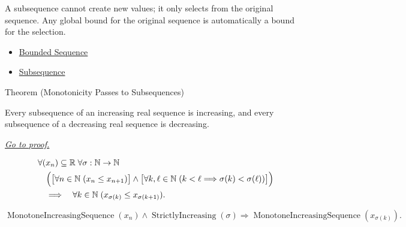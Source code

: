 \begin{remark*}[Interpretation]
A subsequence cannot create new values; it only selects from the original
sequence. Any global bound for the original sequence is automatically a bound
for the selection.
\end{remark*}

\begin{dependencies}
\begin{itemize}
  \item \hyperref[def:bounded-sequence]{Bounded Sequence}
  \item \hyperref[def:subsequence]{Subsequence}
\end{itemize}
\end{dependencies}


\begin{theorembox}{Theorem (Monotonicity Passes to Subsequences)}
\begin{theorem}
\label{thm:monotonicity-passes-to-subsequences}
Every subsequence of an increasing real sequence is increasing, and every
subsequence of a decreasing real sequence is decreasing.

\smallskip
\noindent
\hyperref[prf:monotonicity-passes-to-subsequences]{\textit{Go to proof.}}
\end{theorem}
\end{theorembox}

\begin{remark*}
\[
\begin{aligned}
&\forall (x_n)\subseteq\mathbb{R}\;\forall \sigma:\mathbb{N}\to\mathbb{N}\\
&\quad\Bigl(
  \bigl[\forall n\in\mathbb{N}\;(x_n\le x_{n+1})\bigr]
  \land
  \bigl[\forall k,\ell\in\mathbb{N}\;(k<\ell\Longrightarrow\sigma(k)<\sigma(\ell))\bigr]
\Bigr)\\
&\quad\Longrightarrow\quad
\forall k\in\mathbb{N}\;(x_{\sigma(k)}\le x_{\sigma(k+1)}).
\end{aligned}
\]
\end{remark*}

\begin{remark*}
\[
\operatorname{MonotoneIncreasingSequence}(x_n)
\land
\operatorname{StrictlyIncreasing}(\sigma)
\Longrightarrow
\operatorname{MonotoneIncreasingSequence}(x_{\sigma(k)}).
\]
\end{remark*}

